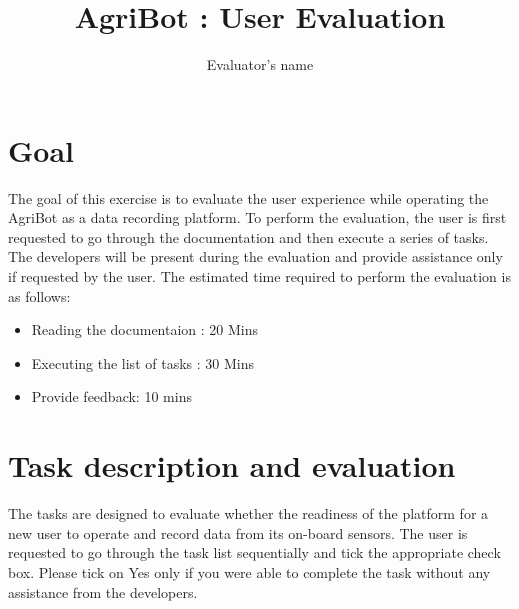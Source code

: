 \documentclass[10pt,a4paper]{article}
\title{AgriBot : User Evaluation}
\author{Evaluator's name}
\begin{document}
\maketitle

\section{Goal}

The goal of this exercise is to evaluate the user experience while operating
the AgriBot as a data recording platform. To perform the evaluation, the user is
first requested to go through the documentation and then execute a series of tasks. The developers will be present during the evaluation and provide assistance only if
requested by the user. The estimated time required to perform the evaluation is as follows:
\begin{itemize}
	\item Reading the documentaion : 20 Mins
	\item Executing the list of tasks : 30 Mins
	\item Provide feedback: 10 mins
\end{itemize}


\section{Task description and evaluation}

The tasks are designed to evaluate whether the readiness of the platform for a new user to operate and record data from its on-board sensors. The user is requested to go through the task list sequentially and tick the appropriate check box. Please tick on Yes only if you were able to complete the task without any assistance from the developers.   
\end{document}
